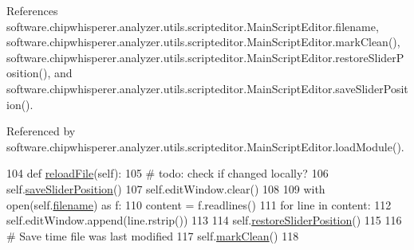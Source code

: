 References software.\+chipwhisperer.\+analyzer.\+utils.\+scripteditor.\+Main\+Script\+Editor.\+filename, software.\+chipwhisperer.\+analyzer.\+utils.\+scripteditor.\+Main\+Script\+Editor.\+mark\+Clean(), software.\+chipwhisperer.\+analyzer.\+utils.\+scripteditor.\+Main\+Script\+Editor.\+restore\+Slider\+Position(), and software.\+chipwhisperer.\+analyzer.\+utils.\+scripteditor.\+Main\+Script\+Editor.\+save\+Slider\+Position().



Referenced by software.\+chipwhisperer.\+analyzer.\+utils.\+scripteditor.\+Main\+Script\+Editor.\+load\+Module().


\begin{DoxyCode}
104     \textcolor{keyword}{def }\hyperlink{classsoftware_1_1chipwhisperer_1_1analyzer_1_1utils_1_1scripteditor_1_1MainScriptEditor_adde1ee78719417deaf23c0abcf3c42c3}{reloadFile}(self):
105         \textcolor{comment}{# todo: check if changed locally?}
106         self.\hyperlink{classsoftware_1_1chipwhisperer_1_1analyzer_1_1utils_1_1scripteditor_1_1MainScriptEditor_afee005fa2b8fcdef51d4f65a92341c57}{saveSliderPosition}()
107         self.editWindow.clear()
108 
109         with open(self.\hyperlink{classsoftware_1_1chipwhisperer_1_1analyzer_1_1utils_1_1scripteditor_1_1MainScriptEditor_ad28af7fb96b78c1d45631d308c27d69d}{filename}) \textcolor{keyword}{as} f:
110             content = f.readlines()
111             \textcolor{keywordflow}{for} line \textcolor{keywordflow}{in} content:
112                 self.editWindow.append(line.rstrip())
113 
114         self.\hyperlink{classsoftware_1_1chipwhisperer_1_1analyzer_1_1utils_1_1scripteditor_1_1MainScriptEditor_a132cd1d75d98632993a2da5d8c47d5a4}{restoreSliderPosition}()
115 
116         \textcolor{comment}{# Save time file was last modified}
117         self.\hyperlink{classsoftware_1_1chipwhisperer_1_1analyzer_1_1utils_1_1scripteditor_1_1MainScriptEditor_af1289d27a909c61f77eb968e9eabed73}{markClean}()
118 
\end{DoxyCode}
\hypertarget{classsoftware_1_1chipwhisperer_1_1analyzer_1_1utils_1_1scripteditor_1_1MainScriptEditor_a132cd1d75d98632993a2da5d8c47d5a4}{}
